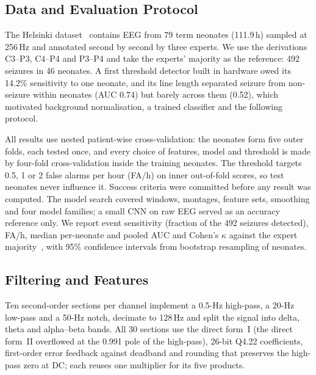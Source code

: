 \documentclass[conference]{IEEEtran}
\begin{document}
\subsection{Data and Evaluation Protocol}

The Helsinki dataset~\cite{stevenson2019} contains EEG from 79 term neonates (111.9\,h) sampled at 256\,Hz and annotated second by second by three experts. We use the derivations C3--P3, C4--P4 and P3--P4 and take the experts' majority as the reference: 492 seizures in 46 neonates. A first threshold detector built in hardware owed its 14.2\% sensitivity to one neonate, and its line length separated seizure from non-seizure within neonates (AUC 0.74) but barely across them (0.52), which motivated background normalisation, a trained classifier and the following protocol.

All results use nested patient-wise cross-validation: the neonates form five outer folds, each tested once, and every choice of features, model and threshold is made by four-fold cross-validation inside the training neonates. The threshold targets 0.5, 1 or 2 false alarms per hour (FA/h) on inner out-of-fold scores, so test neonates never influence it. Success criteria were committed before any result was computed. The model search covered windows, montages, feature sets, smoothing and four model families; a small CNN on raw EEG served as an accuracy reference only. We report event sensitivity (fraction of the 492 seizures detected), FA/h, median per-neonate and pooled AUC and Cohen's $\kappa$ against the expert majority~\cite{cohen1960}, with 95\% confidence intervals from bootstrap resampling of neonates.

\subsection{Filtering and Features}

Ten second-order sections per channel implement a 0.5-Hz high-pass, a 20-Hz low-pass and a 50-Hz notch, decimate to 128\,Hz and split the signal into delta, theta and alpha--beta bands. All 30 sections use the direct form~I (the direct form~II overflowed at the 0.991 pole of the high-pass), 26-bit Q4.22 coefficients, first-order error feedback against deadband and rounding that preserves the high-pass zero at DC; each reuses one multiplier for its five products.
\end{document}
